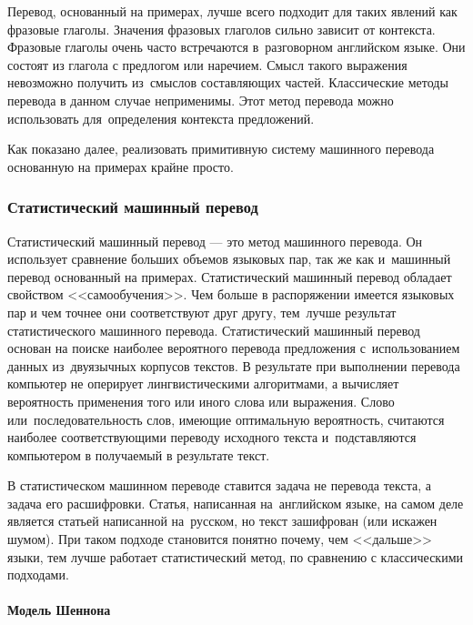 Перевод, основанный на примерах, лучше всего подходит 
для таких явлений как фразовые глаголы. 
Значения фразовых глаголов сильно зависит от контекста. 
Фразовые глаголы очень часто встречаются 
в~разговорном английском языке. 
Они состоят из глагола с предлогом или наречием. 
Смысл такого выражения невозможно получить 
из~смыслов составляющих частей. 
Классические методы перевода в данном случае неприменимы. 
Этот метод перевода можно использовать 
для~определения контекста предложений.

Как показано далее, реализовать примитивную систему 
машинного перевода основанную на примерах крайне просто.

\subsubsection{Статистический машинный перевод}

Статистический машинный перевод --- это метод машинного перевода.
Он использует сравнение больших объемов языковых пар, 
так же как и~машинный перевод основанный на примерах. 
Статистический машинный перевод обладает свойством <<самообучения>>. 
Чем больше в распоряжении имеется языковых пар 
и чем точнее они соответствуют друг другу, 
тем~лучше результат статистического машинного перевода. 
Статистический машинный перевод основан на поиске 
наиболее вероятного перевода предложения с~использованием 
данных из~двуязычных корпусов текстов. 
В результате при выполнении перевода компьютер 
не оперирует лингвистическими алгоритмами, 
а вычисляет вероятность применения того или иного слова или выражения. 
Слово или~последовательность слов, 
имеющие оптимальную вероятность, 
считаются наиболее соответствующими переводу исходного 
текста и~подставляются компьютером в получаемый в результате текст. 

В статистическом машинном переводе ставится 
задача не перевода текста, а задача его расшифровки. 
Статья, написанная на~английском языке, 
на самом деле является статьей написанной на~русском, 
но текст зашифрован (или искажен шумом). 
При таком подходе становится понятно почему, 
чем <<дальше>> языки, тем лучше работает статистический метод, 
по сравнению с классическими подходами.

\paragraph{Модель Шеннона}

